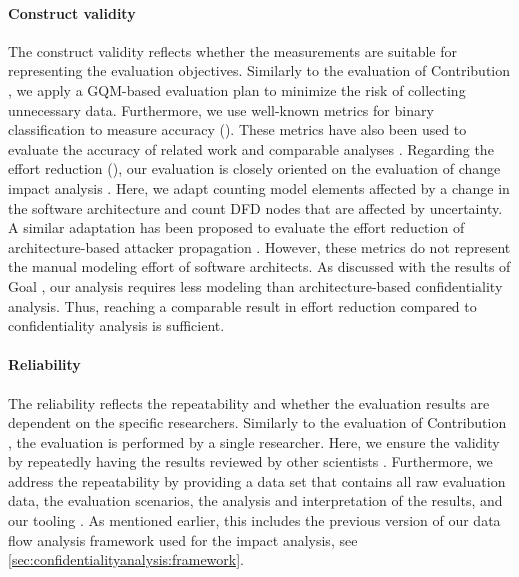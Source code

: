 \paragraph*{Construct validity}
The construct validity reflects whether the measurements are suitable for representing the evaluation objectives.
Similarly to the evaluation of Contribution , we apply a \ac{GQM}-based evaluation plan \cite{basili_goal_1994,basili_methodology_1984} to minimize the risk of collecting unnecessary data.
Furthermore, we use well-known metrics for binary classification \cite{powers_evaluation_2011,van_rijsbergen_information_1979} to measure accuracy ().
These metrics have also been used to evaluate the accuracy of related work and comparable analyses \cite{walter_context-based_2023,seifermann_architectural_2022}.
Regarding the effort reduction (), our evaluation is closely oriented on the evaluation of change impact analysis \cite{rostami_architecture-based_2017,busch_architecture-based_2020}.
Here, we adapt counting model elements affected by a change in the software architecture and count \ac{DFD} nodes that are affected by uncertainty.
A similar adaptation has been proposed to evaluate the effort reduction of architecture-based attacker propagation \cite{walter_context-based_2023,walter_architectural_2022-1,hahner_architecture-based_2024}.
However, these metrics do not represent the manual modeling effort of software architects.
As discussed with the results of Goal , our analysis requires less modeling than architecture-based confidentiality analysis.
Thus, reaching a comparable result in effort reduction compared to confidentiality analysis is sufficient.


\paragraph*{Reliability}
The reliability reflects the repeatability and whether the evaluation results are dependent on the specific researchers.
Similarly to the evaluation of Contribution , the evaluation is performed by a single researcher.
Here, we ensure the validity by repeatedly having the results reviewed by other scientists \cite{benkler_architecture-based_2022,priss_mobility_2022}.
Furthermore, we address the repeatability by providing a data set \cite{dataset} that contains all raw evaluation data, the evaluation scenarios, the analysis and interpretation of the results, and our tooling \uia.
As mentioned earlier, this includes the previous version of our data flow analysis framework used for the impact analysis, see \autoref{sec:confidentialityanalysis:framework}.





